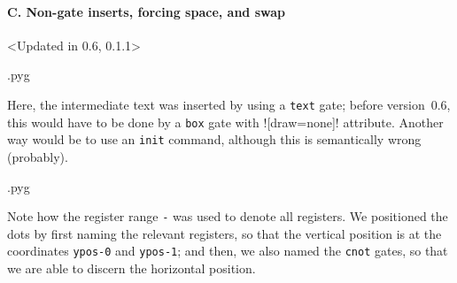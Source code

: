 \documentclass{scrartcl}
\makeatletter
\newenvironment{codeexample}{%
   \VerbatimEnvironment%
   \let\FVB@VerbatimOut\minted@FVB@VerbatimOut
   \let\FVE@VerbatimOut\minted@FVE@VerbatimOut
   \minted@configlang{tex}%
   \minted@fvset
   \begin{VerbatimOut}[codes={\catcode`\^^I=12},firstline,lastline]{\minted@jobname.pyg}%
}{
   \end{VerbatimOut}%
   \minted@langlinenoson%
   \savebox\codeexamplebox{ \minted@jobname.pyg}%
   \ifdim\wd\codeexamplebox>\dimexpr.5\linewidth-3mm\relax%
      \wd\codeexamplebox=.5\linewidth%
   \else%
      \wd\codeexamplebox=\dimexpr\wd\codeexamplebox+3mm\relax%
   \fi%
   \noindent\begin{minipage}{\wd\codeexamplebox}%
      \centering%
      \usebox\codeexamplebox%
   \end{minipage}%
   \begin{minipage}{\dimexpr\linewidth-\wd\codeexamplebox\relax}%
      \expandafter\minted@pygmentize\expandafter{\minted@lang}%
   \end{minipage}%
   \minted@langlinenosoff%
   \par%
}
\def\ttlink{\link\texttt}
\makeatother
\begin{document}
            \paragraph{C. Non-gate inserts, forcing space, and swap}\leavevmode
               \begin{example}<Updated in 0.6, 0.1.1>
                  \begin{codeexample}
                  \end{codeexample}
                  Here, the intermediate text was inserted by using a \ttlink{text} gate; before version~0.6, this would have to be done by a \ttlink{box} gate with \yquant![draw=none]! attribute.
                  Another way would be to use an \ttlink{init} command, although this is semantically wrong (probably).
               \end{example}

               \begin{example}
                  \begin{codeexample}
                  \end{codeexample}
                  Note how the register range \texttt{-} was used to denote all registers.
                  We positioned the dots by first naming the relevant registers, so that the vertical position is at the coordinates \texttt{ypos-0} and \texttt{ypos-1}; and then, we also named the \ttlink{cnot} gates, so that we are able to discern the horizontal position.
               \end{example}

            \clearpage
\end{document}
